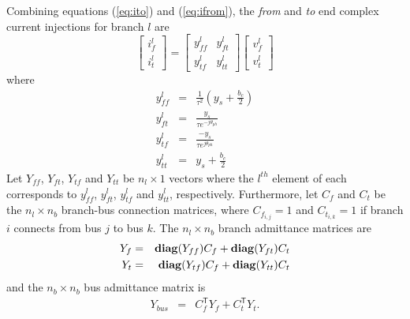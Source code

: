 

Combining equations (\ref{eq:ito}) and (\ref{eq:ifrom}), the \textit{from}
and \textit{to} end complex current injections for branch $l$ are
\begin{equation}
\label{eq:ybranch}
\begin{bmatrix}
i_f^l\\
i_t^l
\end{bmatrix}
=
\begin{bmatrix}
y_{ff}^l& y_{ft}^l\\
y_{tf}^l& y_{tt}^l
\end{bmatrix}
\begin{bmatrix}
v_f^l\\
v_t^l
\end{bmatrix}
\end{equation}
where
\begin{eqnarray}
\label{eq:yff}
y_{ff}^l& =& \frac{1}{\tau^2} \left(y_s + \frac{b_c}{2}\right)\\
\label{eq:yft}
y_{ft}^l& =& \frac{y_s}{\tau e^{-j\theta_{ph}}}\\
\label{eq:ytf}
y_{tf}^l& =& \frac{-y_s}{\tau e^{j\theta_{ph}}}\\
\label{eq:ytt}
y_{tt}^l& =& y_s + \frac{b_c}{2}
\end{eqnarray}
Let $Y_{ff}$, $Y_{ft}$, $Y_{tf}$ and $Y_{tt}$ be $n_l \times 1$ vectors where
the $l^{th}$ element of each corresponds to $y_{ff}^l$, $y_{ft}^l$,
$y_{tf}^l$ and $y_{tt}^l$, respectively.  Furthermore, let $C_f$ and $C_t$ be the
$n_l \times n_b$ branch-bus connection matrices, where $C_{f_{i,j}} = 1$ and
$C_{t_{i,k}} = 1$ if branch $i$ connects from bus $j$ to bus $k$.  The
$n_l \times n_b$ branch admittance matrices are
\begin{eqnarray}
Y_f& =& \mathop{\mathbf{diag}}(Y_{ff})C_f + \mathop{\mathbf{diag}}(Y_{ft})C_t\\
Y_t& =& \mathop{\mathbf{diag}}(Y_{tf})C_f + \mathop{\mathbf{diag}}(Y_{tt})C_t
\end{eqnarray}
and the
$n_b \times n_b$ bus admittance matrix is
\begin{eqnarray}
Y_{bus}& =& C_f^\mathsf{T} Y_f + C_t^\mathsf{T} Y_t .
\end{eqnarray}

